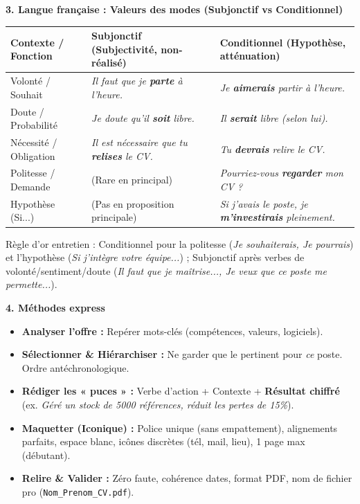 \documentclass[11pt]{article}
\newcommand{\cle}[1]{{\popxbold\color{popdark}#1}}
\begin{document}
\textbf{3. Langue française : Valeurs des modes (Subjonctif vs Conditionnel)}
\begin{center}
\begin{tabularx}{\linewidth}{|l|X|X|}\hline
\rowcolor{popblueL} \textbf{Contexte / Fonction} & \textbf{Subjonctif} (Subjectivité, non-réalisé) & \textbf{Conditionnel} (Hypothèse, atténuation) \\ \hline
\cle{Volonté / Souhait} & \textit{Il faut que je \textbf{parte} à l'heure.} & \textit{Je \textbf{aimerais} partir à l'heure.} \\ \hline
\cle{Doute / Probabilité} & \textit{Je doute qu'il \textbf{soit} libre.} & \textit{Il \textbf{serait} libre (selon lui).} \\ \hline
\cle{Nécessité / Obligation} & \textit{Il est nécessaire que tu \textbf{relises} le CV.} & \textit{Tu \textbf{devrais} relire le CV.} \\ \hline
\cle{Politesse / Demande} & (Rare en principal) & \textit{Pourriez-vous \textbf{regarder} mon CV ?} \\ \hline
\cle{Hypothèse (Si...)} & (Pas en proposition principale) & \textit{Si j'avais le poste, je \textbf{m'investirais} pleinement.} \\ \hline
\end{tabularx}
\end{center}
\cle{Règle d'or entretien} : Conditionnel pour la politesse (\textit{Je souhaiterais, Je pourrais}) et l'hypothèse (\textit{Si j'intègre votre équipe...}) ; Subjonctif après verbes de volonté/sentiment/doute (\textit{Il faut que je maîtrise..., Je veux que ce poste me permette...}).

\textbf{4. Méthodes express}
\begin{methode}
\begin{itemize}
    \item \textbf{Analyser l'offre :} Repérer mots-clés (compétences, valeurs, logiciels).
    \item \textbf{Sélectionner \& Hiérarchiser :} Ne garder que le pertinent pour \emph{ce} poste. Ordre antéchronologique.
    \item \textbf{Rédiger les « puces » :} Verbe d'action + Contexte + \textbf{Résultat chiffré} (ex. \textit{Géré un stock de 5000 références, réduit les pertes de 15\%}).
    \item \textbf{Maquetter (Iconique) :} Police unique (sans empattement), alignements parfaits, espace blanc, icônes discrètes (tél, mail, lieu), 1 page max (débutant).
    \item \textbf{Relire \& Valider :} Zéro faute, cohérence dates, format PDF, nom de fichier pro (\texttt{Nom\_Prenom\_CV.pdf}).
\end{itemize}
\end{methode}
\end{document}
